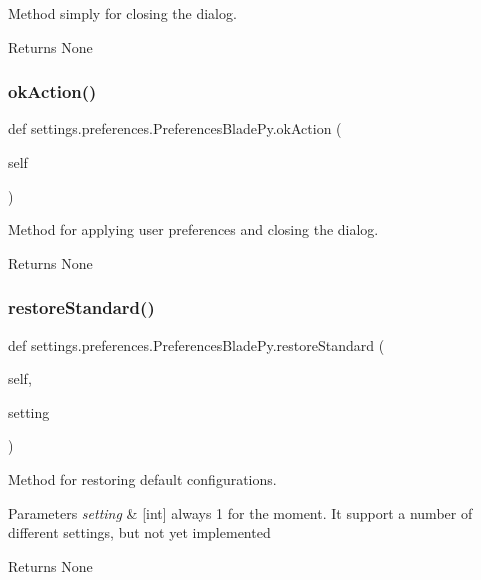 Method simply for closing the dialog. 

\begin{DoxyReturn}{Returns}
None 
\end{DoxyReturn}
\hypertarget{a00103_a7e99113696fefa62dfdeb2ba1279350c}{}\label{a00103_a7e99113696fefa62dfdeb2ba1279350c} 
\subsubsection{\texorpdfstring{ok\+Action()}{okAction()}}
{\footnotesize\ttfamily def settings.\+preferences.\+Preferences\+Blade\+Py.\+ok\+Action (\begin{DoxyParamCaption}\item[{}]{self }\end{DoxyParamCaption})}



Method for applying user preferences and closing the dialog. 

\begin{DoxyReturn}{Returns}
None 
\end{DoxyReturn}
\hypertarget{a00103_ab74be9049535f502252efb2df560ac8e}{}\label{a00103_ab74be9049535f502252efb2df560ac8e} 
\subsubsection{\texorpdfstring{restore\+Standard()}{restoreStandard()}}
{\footnotesize\ttfamily def settings.\+preferences.\+Preferences\+Blade\+Py.\+restore\+Standard (\begin{DoxyParamCaption}\item[{}]{self,  }\item[{}]{setting }\end{DoxyParamCaption})}



Method for restoring default configurations. 


\begin{DoxyParams}{Parameters}
{\em setting} & \mbox{[}int\mbox{]} always 1 for the moment. It support a number of different settings, but not yet implemented \\
\hline
\end{DoxyParams}
\begin{DoxyReturn}{Returns}
None 
\end{DoxyReturn}
\hypertarget{a00103_a9cfbfd7abab4ba14d80c573a0534040b}{}\label{a00103_a9cfbfd7abab4ba14d80c573a0534040b} 
